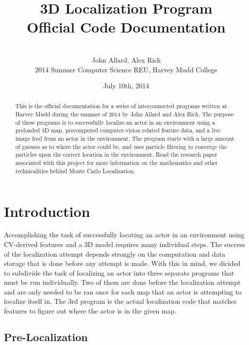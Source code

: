 \documentclass[a4paper,11pt]{article}
\title{3D Localization Program \\ Official Code Documentation}
\author{ \\[6.5in]  John Allard, Alex Rich \\ 2014 Summer Computer Science REU, Harvey Mudd College}
\date{July 10th, 2014}
\begin{document}
  \maketitle
  
  \newpage

    \tableofcontents
    \newpage
    
    \begin{abstract}
    This is the official documentation for a series of interconnected programs written at Harvey Mudd during the summer of 2014 by John Allard and Alex Rich. The purpose of these programs is to successfully localize an actor in an environment using a preloaded 3D map, precomputed computer-vision related feature data, and a live image feed from an actor in the environment. The program starts with a large amount of guesses as to where the actor could be, and uses particle filtering to converge the particles upon the correct location in the environment. Read the research paper associated with this project for more information on the mathematics and other technicalities behind Monte Carlo Localization.
    \end{abstract}

    \section{Introduction}
    Accomplishing the task of successfully locating an actor in an environment using CV-derived features and a 3D model requires many individual steps. The success of the localization attempt depends strongly on the computation and data storage that is done before any attempt is made. With this in mind, we dicided to subdivide the task of localizing an actor into three separate programs that must be run individually. Two of them are done before the localization attempt and are only needed to be ran once for each map that an actor is attempting to localize itself in. The 3rd program is the actual localization code that matches features to figure out where the actor is in the given map.

        \subsection{Pre-Localization}
\end{document}
